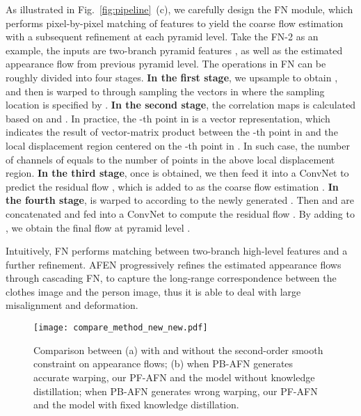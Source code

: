 \documentclass[final]{cvpr}
\begin{document}
As illustrated in Fig.~\ref{fig:pipeline}~(c), 
we carefully design the FN module, which performs pixel-by-pixel matching of features to yield the coarse flow estimation with a subsequent refinement at each pyramid level.
Take the FN-2 as an example, the inputs are two-branch pyramid features , as well as the estimated appearance flow  from previous pyramid level.
The operations in FN can be roughly divided into four stages.
\textbf{In the first stage}, we upsample  to obtain , and then  is warped to  
	through sampling the vectors in  where the sampling location is specified by .
\textbf{In the second stage}, the correlation maps  is calculated based on  and .
In practice, the -th point in  is a vector representation, which indicates the result of vector-matrix product between the -th point in  and the local displacement region centered on the -th point in .
In such case, the number of channels of  equals to the number of points in the above local displacement region. 
\textbf{In the third stage}, once  is obtained, we then feed it into a ConvNet to predict the residual flow , which is added to  as the coarse flow estimation .
\textbf{In the fourth stage},  is warped to  according to the newly generated .
Then  and  are concatenated and fed into a ConvNet to compute the residual flow .
By adding  to , we obtain the final flow  at pyramid level .
	
Intuitively, FN performs matching between two-branch high-level features and a further refinement.
AFEN progressively refines the estimated appearance flows through cascading  FN, to capture the long-range correspondence between the clothes image and the person image, thus it is able to deal with large misalignment and deformation. 

	
	
	
	\begin{figure}[t]
		\begin{center}
\texttt{[image: compare\_method\_new\_new.pdf]}
		\end{center}
		\caption{Comparison between (a) with and without the second-order smooth constraint on appearance flows; (b) when PB-AFN generates accurate warping, our PF-AFN and the model without knowledge distillation; when PB-AFN generates wrong warping, our PF-AFN and the model with fixed knowledge distillation.}
		\vspace{-10pt}
		\label{fig:method_compare}
	\end{figure}
	
	
	
\end{document}
